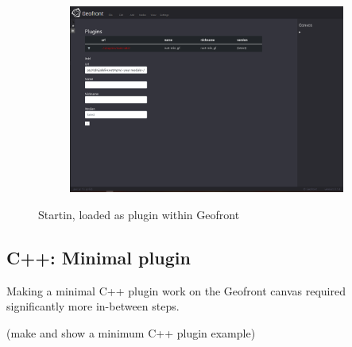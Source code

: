 \begin{figure}
\begin{subfigure}[b]{\linewidth}
    \graphicspath{{../../assets/images/6.1.2}}
    \centering
    \includegraphics[width=\linewidth]{2.PNG}
  \end{subfigure}%
  \caption[Types of \ac{vpl}s]{Startin, loaded as plugin within Geofront}%
  \label{fig:startin-plugin}
  \end{figure}

\subsection{C++: Minimal plugin}  

Making a minimal C++ plugin work on the Geofront canvas required significantly more in-between steps. 




(make and show a minimum C++ plugin example)

